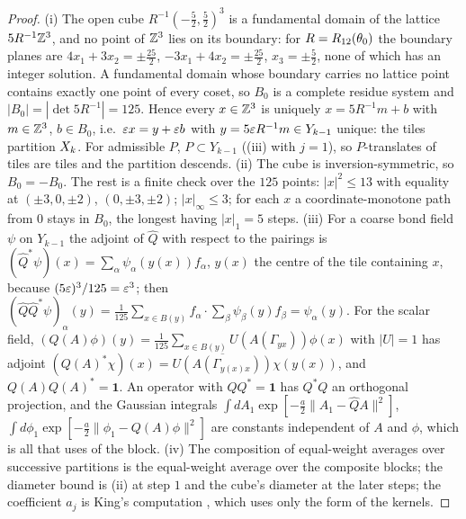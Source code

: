 \begin{proof}
(i) The open cube $R^{-1}(-\frac52,\frac52)^3$ is a fundamental domain of the lattice $5R^{-1}\mathbb Z^3$, and no point of $\mathbb Z^3$ lies on its boundary: for $R=R_{12}(\theta_0)$ the boundary planes are $4x_1+3x_2=\pm\frac{25}2$, $-3x_1+4x_2=\pm\frac{25}2$, $x_3=\pm\frac52$, none of which has an integer solution. A fundamental domain whose boundary carries no lattice point contains exactly one point of every coset, so $B_0$ is a complete residue system and $|B_0|=|\det5R^{-1}|=125$. Hence every $x\in\mathbb Z^3$ is uniquely $x=5R^{-1}m+b$ with $m\in\mathbb Z^3$, $b\in B_0$, i.e.\ $\varepsilon x=y+\varepsilon b$ with $y=5\varepsilon R^{-1}m\in Y_{k-1}$ unique: the tiles partition $X_k$. For admissible $P$, $P\subset Y_{k-1}$ ((iii) with $j=1$), so $P$-translates of tiles are tiles and the partition descends. (ii) The cube is inversion-symmetric, so $B_0=-B_0$. The rest is a finite check over the $125$ points: $|x|^2\le13$ with equality at $(\pm3,0,\pm2)$, $(0,\pm3,\pm2)$; $|x|_\infty\le3$; for each $x$ a coordinate-monotone path from $0$ stays in $B_0$, the longest having $|x|_1=5$ steps. (iii) For a coarse bond field $\psi$ on $Y_{k-1}$ the adjoint of $\hat Q$ with respect to the pairings is $(\hat Q^*\psi)(x)=\sum_\alpha\psi_\alpha(y(x))f_\alpha$, $y(x)$ the centre of the tile containing $x$, because $(5\varepsilon)^3/125=\varepsilon^3$; then $(\hat Q\hat Q^*\psi)_\alpha(y)=\frac1{125}\sum_{x\in B(y)}f_\alpha\cdot\sum_\beta\psi_\beta(y)f_\beta=\psi_\alpha(y)$. For the scalar field, $(Q(A)\phi)(y)=\frac1{125}\sum_{x\in B(y)}U(A(\Gamma_{yx}))\phi(x)$ with $|U|=1$ has adjoint $(Q(A)^*\chi)(x)=\overline{U(A(\Gamma_{y(x)x}))}\chi(y(x))$, and $Q(A)Q(A)^*=\mathbf 1$. An operator with $QQ^*=\mathbf 1$ has $Q^*Q$ an orthogonal projection, and the Gaussian integrals $\int dA_1\exp[-\frac a2\|A_1-\hat QA\|^2]$, $\int d\phi_1\exp[-\frac a2\|\phi_1-Q(A)\phi\|^2]$ are constants independent of $A$ and $\phi$, which is all that \cite[(2.10)--(2.14)]{K1} uses of the block. (iv) The composition of equal-weight averages over successive partitions is the equal-weight average over the composite blocks; the diameter bound is (ii) at step $1$ and the cube's diameter at the later steps; the coefficient $a_j$ is King's computation \cite[p.~653]{K1}, which uses only the form of the kernels.
\end{proof}

